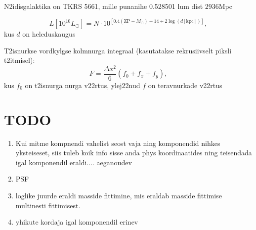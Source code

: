 \documentclass{article}
\begin{document}
	N2idisgalaktika on TKRS 5661, mille punanihe 0.528501 lum dist 2936Mpc
	
	\begin{equation}
		L\left[ 10^{10}L_\odot \right] = N\cdot10^{\left[ 0.4(\mathrm{ZP}-M_\odot) -14 + 2\log(d[\mathrm{kpc}]) \right]},
	\end{equation}
	kus $d$ on heleduskaugus
	
	T2isnurkse vordkylgse kolmnurga integraal (kasutatakse rekrusiivselt piksli t2itmisel):
	\begin{equation}
		F = \frac{\Delta x^2}{6}(f_0+f_x+f_y),
	\end{equation}
	kus $f_0$ on t2isnurga nurga v22rtus, ylej22nud $f$ on teravnurkade v22rtus
	
	\section{TODO} %
	\label{sec:todo}
	\begin{enumerate}
		\item Kui mitme kompnendi vahelist seost vaja ning komponendid nihkes yksteiseset, siis tuleb koik info sisse anda phys koordinaatides ning teisendada igal komponendil eraldi.... aeganoudev
		\item PSF
		\item loglike juurde eraldi masside fittimine, mis eraldab masside fittimise multinesti fittimisest.
		\item yhikute kordaja igal komponendil erinev
	\end{enumerate}
\end{document}
